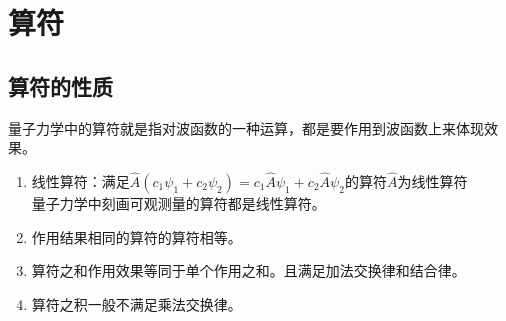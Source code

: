\section{算符}
\subsection{算符的性质}
量子力学中的算符就是指对波函数的一种运算，都是要作用到波函数上来体现效果。
\begin{enumerate}
    \item 线性算符：满足$\hat{A}(c_1\psi_1+c_2\psi_2)=c_1\hat{A}\psi_1+c_2\hat{A}\psi_2$的算符$\hat{A}$为线性算符\\
量子力学中刻画可观测量的算符都是线性算符。
    \item 作用结果相同的算符的算符相等。
    \item 算符之和作用效果等同于单个作用之和。且满足加法交换律和结合律。
    \item 算符之积一般不满足乘法交换律。
\end{enumerate}
